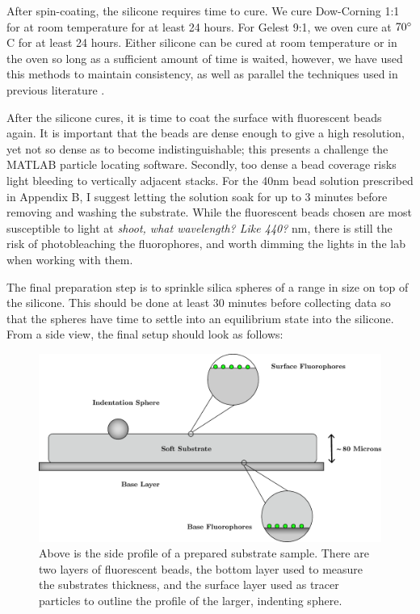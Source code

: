 After spin-coating, the silicone requires time to cure. We cure Dow-Corning 1:1 for at room temperature for at least 24 hours. For Gelest 9:1, we oven cure at $70 \degree$ C for at least 24 hours. Either silicone can be cured at room temperature or in the oven so long as a sufficient amount of time is waited, however, we have used this methods to maintain consistency, as well as parallel the techniques used in previous literature \cite{xu2017direct}.

After the silicone cures, it is time to coat the surface with fluorescent beads again. It is important that the beads are dense enough to give a high resolution, yet not so dense as to become indistinguishable; this presents a challenge the MATLAB particle locating software. Secondly, too dense a bead coverage risks light bleeding to vertically adjacent stacks. For the 40nm bead solution prescribed in Appendix B, I suggest letting the solution soak for up to 3 minutes before removing and washing the substrate. While the fluorescent beads chosen are most susceptible to light at \emph{shoot, what wavelength? Like 440?} nm, there is still the risk of photobleaching the fluorophores, and worth dimming the lights in the lab when working with them. 

The final preparation step is to sprinkle silica spheres of a range in size on top of the silicone. This should be done at least 30 minutes before collecting data so that the spheres have time to settle into an equilibrium state into the silicone. From a side view, the final setup should look as follows: 
\begin{figure}[h!]
	\centering
	\includegraphics[width=\linewidth]{Chapters/Figures/substrate_graphic_new}
	\caption[Prepared Substrate Profile]{Above is the side profile of a prepared substrate sample. There are two layers of fluorescent beads, the bottom layer used to measure the substrates thickness, and the surface layer used as tracer particles to outline the profile of the larger, indenting sphere.}
	\label{fig:substrategraphic}
\end{figure}



